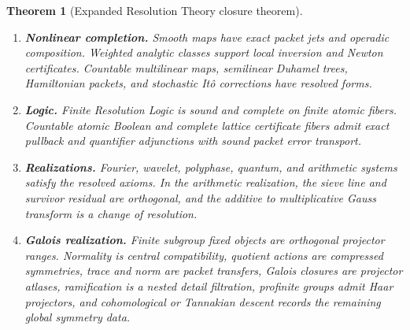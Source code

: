 \documentclass{aomart}
\newtheorem{theorem}{Theorem}[section]
\theoremstyle{definition}
\theoremstyle{remark}
\begin{document}
\begin{theorem}[Expanded Resolution Theory closure theorem]
\begin{enumerate}
\item \textbf{Nonlinear completion.} Smooth maps have exact packet jets and operadic composition. Weighted analytic classes support local inversion and Newton certificates. Countable multilinear maps, semilinear Duhamel trees, Hamiltonian packets, and stochastic Itô corrections have resolved forms.
\item \textbf{Logic.} Finite Resolution Logic is sound and complete on finite atomic fibers. Countable atomic Boolean and complete lattice certificate fibers admit exact pullback and quantifier adjunctions with sound packet error transport.
\item \textbf{Realizations.} Fourier, wavelet, polyphase, quantum, and arithmetic systems satisfy the resolved axioms. In the arithmetic realization, the sieve line and survivor residual are orthogonal, and the additive to multiplicative Gauss transform is a change of resolution.
\item \textbf{Galois realization.} Finite subgroup fixed objects are orthogonal projector ranges. Normality is central compatibility, quotient actions are compressed symmetries, trace and norm are packet transfers, Galois closures are projector atlases, ramification is a nested detail filtration, profinite groups admit Haar projectors, and cohomological or Tannakian descent records the remaining global symmetry data.
\end{enumerate}
\end{theorem}
\end{document}
